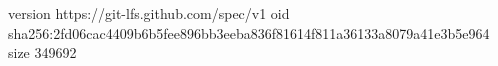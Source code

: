 version https://git-lfs.github.com/spec/v1
oid sha256:2fd06cac4409b6b5fee896bb3eeba836f81614f811a36133a8079a41e3b5e964
size 349692
